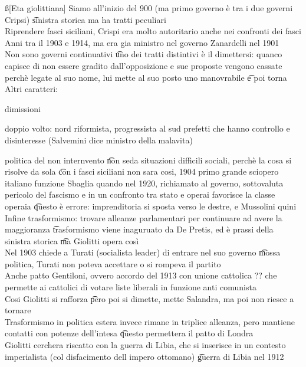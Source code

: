 \documentclass[12pt]{article}
\begin{document}
\s[Ripasso]
\ss[Eta giolittiana]
Siamo all'inizio del 900 (ma primo governo è tra i due governi Cripsi) \t sinistra storica ma ha tratti peculiari \\
Riprendere fasci siciliani, Crispi era molto autoritario anche nei confronti dei fasci \\
Anni tra il 1903 e 1914, ma era gia ministro nel governo Zanardelli nel 1901 \\
Non sono governi continuativi \t uno dei tratti distintivi è il dimettersi: quanco capisce di non essere gradito dall'opposizione e sue proposte vengono cassate perchè legate al suo nome, lui mette al suo posto uno manovrabile \t e poi torna \\
Altri caratteri:
\bi
  \item dimissioni
  \item doppio volto: nord riformista, progressista al sud prefetti che hanno controllo e disinteresse (Salvemini dice ministro della malavita)
  \item politica del non internvento \t non seda situazioni difficili sociali, perchè la cosa si risolve da sola \t con i fasci siciliani non sara cosi, 1904 primo grande sciopero italiano funzione
\ei
Sbaglia quando nel 1920, richiamato al governo, sottovaluta pericolo del fascismo e in un confronto tra stato e operai favorisce la classe operaia \t questo è errore: imprenditoria si sposta verso le destre, e Mussolini quini \\
Infine trasformismo: trovare alleanze parlamentari per continuare ad avere la maggioranza \t trasformismo viene inaguruato da De Pretis, ed è prassi della sinistra storica \t ma Giolitti opera così \\
Nel 1903 chiede a Turati (socialista leader) di entrare nel suo governo \t mossa politica, Turati non poteva accettare o si rompeva il partito \\
Anche patto Gentiloni, ovvero accordo del 1913 con unione cattolica ?? che permette ai cattolici di votare liste liberali in funzione anti comunista \\
Cosi Giolitti si rafforza \t pero poi si dimette, mette Salandra, ma poi non riesce a tornare \\
Trasformismo in politica estera invece rimane in triplice alleanza, pero mantiene contatti con potenze dell'intesa \t questo permettera il patto di Londra \\
Giolitti cerchera riscatto con la guerra di Libia, che si inserisce in un contesto imperialista (col disfacimento dell impero ottomano) \t guerra di Libia nel 1912 \\
\end{document}
